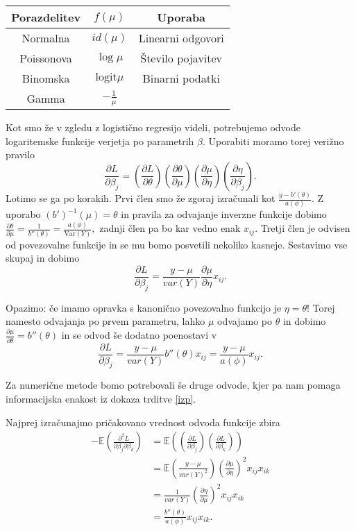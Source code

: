 \documentclass[12pt,a4paper]{amsart}
\theoremstyle{definition} %
\theoremstyle{plain} %
\begin{document}
\begin{center}
    \begin{tabular}{ | c | c | c |}
        \hline
        Porazdelitev & $f(\mu)$ & Uporaba \\
        \hline
        Normalna & $id(\mu)$ &  Linearni odgovori\\
        Poissonova & $\log \mu$ & Število pojavitev \\
        Binomska & $\mathrm{logit}\mu$ & Binarni podatki\\
        Gamma & $-\frac{1}{\mu}$ & \\
        \hline
    \end{tabular}
\end{center}

Kot smo že v zgledu z logistično regresijo videli, potrebujemo odvode logaritemske funkcije verjetja po parametrih $\beta.$ Uporabiti moramo torej verižno pravilo 
\[
    \frac{\partial L}{\partial\beta_{j}} = \left(\frac{\partial L}{\partial \theta}\right)\left(\frac{\partial \theta}{\partial\mu}\right)
    \left(\frac{\partial\mu}{\partial\eta}\right)\left(\frac{\partial\eta}{\partial\beta_{j}}\right).
\]
Lotimo se ga po korakih. Prvi člen smo že zgoraj izračunali kot $\frac{y-b'(\theta)}{a(\phi)}.$ Z uporabo $(b')^{-1}(\mu) = \theta$ in pravila za odvajanje inverzne funkcije 
dobimo $\frac{\partial \theta}{\partial\mu} = \frac{1}{b''(\theta)} = \frac{a(\phi)}{\mathrm{Var}(Y)},$ zadnji člen pa bo kar vedno enak $x_{ij}.$ Tretji člen je odvisen
od povezovalne funkcije in se mu bomo posvetili nekoliko kasneje. Sestavimo vse skupaj in dobimo
\[
    \frac{\partial L}{\partial\beta_{j}} = \frac{y-\mu}{var(Y)}\frac{\partial \mu}{\partial\eta}x_{ij}.
\]

Opazimo: če imamo opravka s kanonično povezovalno funkcijo je $\eta = \theta!$ Torej namesto odvajanja po prvem parametru, lahko $\mu$ odvajamo po $\theta$ in
dobimo $\frac{\partial\mu}{\partial\theta} = b''(\theta)$ in se odvod še dodatno poenostavi v
\begin{equation}
    \frac{\partial L}{\partial\beta_{j}} = \frac{y-\mu}{var(Y)}b''(\theta)x_{ij} = \frac{y-\mu}{a(\phi)}x_{ij}.
\end{equation}

Za numerične metode bomo potrebovali še druge odvode, kjer pa nam pomaga informacijska enakost iz dokaza trditve \ref{izp}.

Najprej izračunajmo pričakovano vrednost odvoda funkcije zbira
\begin{align*}
    -\mathbb{E}(\frac{\partial^2 L}{\partial\beta_{j}\partial\beta_{k}}) &= \mathbb{E}((\frac{\partial L}{\partial \beta_{j}})(\frac{\partial L}{\partial \beta_{k}})) \\
    &= \mathbb{E}(\frac{y-\mu}{var(Y)^2})(\frac{\partial\mu}{\partial\eta})^{2}x_{ij}x_{ik} \\
    &= \frac{1}{var(Y)}(\frac{\partial\eta}{\partial\mu})^{2}x_{ij}x_{ik} \\
    &= \frac{b''(\theta)}{a(\phi)}x_{ij}x_{ik}.
\end{align*}
\end{document}
